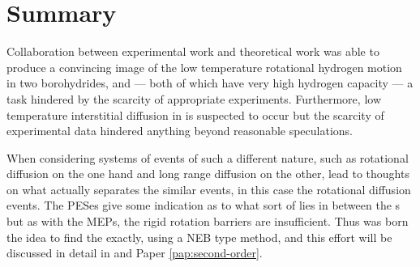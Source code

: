 \section{Summary}
\label{sec:borohydrides-summary}
Collaboration between experimental work and theoretical work was able to produce a convincing image of the low temperature rotational hydrogen motion in two borohydrides,  and  --- both of which have very high hydrogen capacity --- a task hindered by the scarcity of appropriate experiments.
Furthermore, low temperature  interstitial diffusion in  is suspected to occur but the scarcity of experimental data hindered anything beyond reasonable speculations.

When considering systems of events of such a different nature, such as rotational diffusion on the one hand and long range diffusion on the other, lead to thoughts on what actually separates the similar events, in this case the rotational diffusion events.
The PESes give some indication as to what sort of  lies in between the s but as with the MEPs, the rigid rotation barriers are insufficient.
Thus was born the idea to find the  exactly, using a NEB type method, and this effort will be discussed in detail in  and Paper \ref{pap:second-order}.
